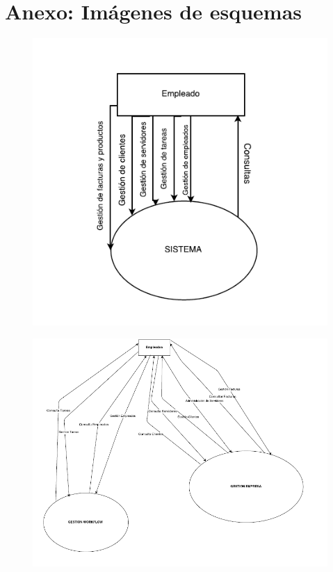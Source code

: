 \documentclass[paper=a4, fontsize=11pt, spanish]{scrartcl}
\begin{document}
\section{Anexo: Imágenes de esquemas}
\newpage
\begin{figure}
	\includegraphics{ERP_EMEGEX.png}
	\caption{}
	\label{fig:cajanegra}
\end{figure}

\begin{figure}
	\includegraphics[width=1.25\textwidth]{ArmazonF.png}
	\caption{}
	\label{fig:armazonF}
\end{figure}
\end{document}
